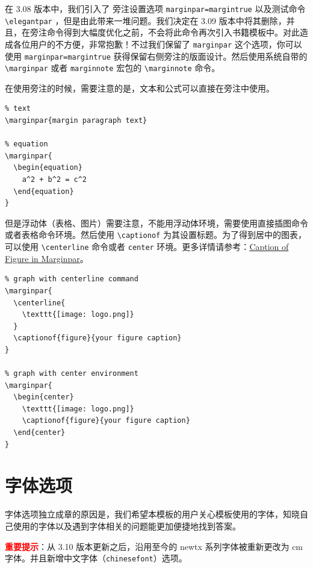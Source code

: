 \documentclass[lang=cn,newtx,10pt,scheme=chinese]{elegantbook}
\begin{document}
在 3.08 版本中，我们引入了 旁注设置选项 \lstinline{marginpar=margintrue} 以及测试命令 \lstinline{\elegantpar} ，但是由此带来一堆问题。我们决定在 3.09 版本中将其删除，并且，在旁注命令得到大幅度优化之前，不会将此命令再次引入书籍模板中。对此造成各位用户的不方便，非常抱歉！不过我们保留了 \lstinline{marginpar} 这个选项，你可以使用 \lstinline{marginpar=margintrue} 获得保留右侧旁注的版面设计。然后使用系统自带的 \lstinline{\marginpar} 或者 \lstinline{marginnote} 宏包的 \lstinline{\marginnote} 命令。

\begin{remark}
在使用旁注的时候，需要注意的是，文本和公式可以直接在旁注中使用。

\begin{lstlisting}
% text
\marginpar{margin paragraph text}

% equation
\marginpar{
  \begin{equation}
    a^2 + b^2 = c^2
  \end{equation}
}
\end{lstlisting}

但是浮动体（表格、图片）需要注意，不能用浮动体环境，需要使用直接插图命令或者表格命令环境。然后使用 \lstinline{\captionof} 为其设置标题。为了得到居中的图表，可以使用 \lstinline{\centerline} 命令或者 \lstinline{center} 环境。更多详情请参考：\href{https://tex.stackexchange.com/questions/5583/caption-of-figure-in-marginpar-and-caption-of-wrapfigure-in-margin}{Caption of Figure in Marginpar}。

\begin{lstlisting}
% graph with centerline command
\marginpar{
  \centerline{
    \texttt{[image: logo.png]}
  }
  \captionof{figure}{your figure caption}
}

% graph with center environment
\marginpar{
  \begin{center}
    \texttt{[image: logo.png]}
    \captionof{figure}{your figure caption}
  \end{center}
}
\end{lstlisting}

\end{remark}

\chapter{字体选项}
字体选项独立成章的原因是，我们希望本模板的用户关心模板使用的字体，知晓自己使用的字体以及遇到字体相关的问题能更加便捷地找到答案。

\textcolor{red}{\bfseries 重要提示}：从 3.10 版本更新之后，沿用至今的 newtx 系列字体被重新更改为 cm 字体。并且新增中文字体（\lstinline{chinesefont}）选项。
\end{document}
